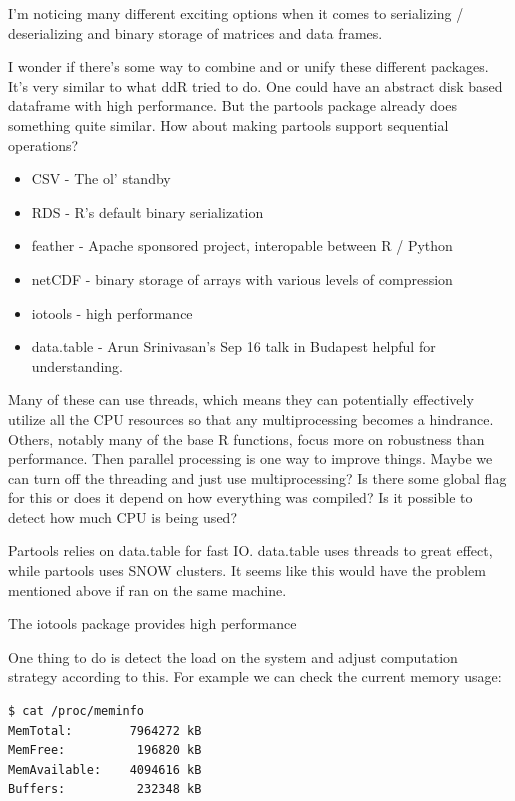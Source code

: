 \documentclass[12pt]{article}
\begin{document}
I'm noticing many different exciting options when it comes to serializing /
deserializing and binary storage of matrices and data frames.

I wonder if there's some way to combine and or unify these different
packages. It's very similar to what ddR tried to do. One could have an
abstract disk based dataframe with high performance. But the partools package already does
something quite similar. How about making partools support sequential
operations?


\begin{itemize}
    \item CSV - The ol' standby
    \item RDS - R's default binary serialization
    \item feather - Apache sponsored project, interopable between R /
        Python
    \item netCDF - binary storage of arrays with various levels of
        compression
    \item iotools - high performance \cite{arnold2015iotools} 
    \item data.table - Arun Srinivasan's Sep 16 talk in Budapest helpful
        for understanding.

\end{itemize}


Many of these can use threads, which means they can potentially effectively
utilize all the CPU resources so that any multiprocessing becomes a hindrance.
Others, notably many of the base R functions, focus more on robustness than
performance. Then parallel processing is one way to improve things.
Maybe we can turn off the threading and just use multiprocessing? Is there
some global flag for this or does it depend on how everything was compiled?
Is it possible to detect how much CPU is being used?

Partools relies on data.table for fast IO. data.table uses
threads to great effect, while partools uses SNOW clusters. It seems like
this would have the problem mentioned above if ran on the same machine.

The iotools package provides high performance


One thing to do is detect the load on the system and adjust computation
strategy according to
this. For example we can check the current memory usage:

\begin{verbatim}
$ cat /proc/meminfo
MemTotal:        7964272 kB
MemFree:          196820 kB
MemAvailable:    4094616 kB
Buffers:          232348 kB
\end{verbatim}



 
\end{document}
